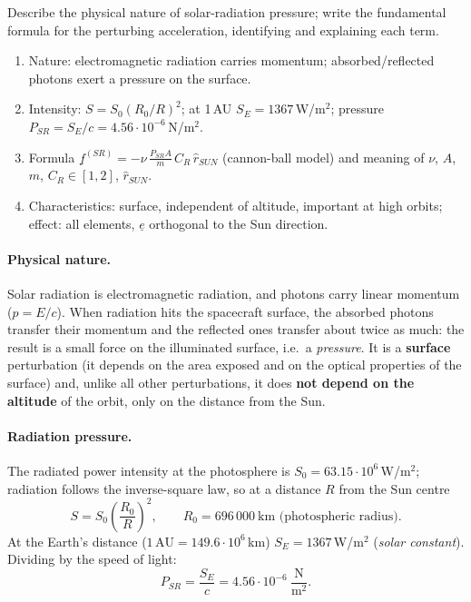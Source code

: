 \begin{qbox}
Describe the physical nature of solar-radiation pressure; write the fundamental formula for the perturbing acceleration,
identifying and explaining each term.
\end{qbox}

\begin{outline}
\begin{enumerate}
\item Nature: electromagnetic radiation carries momentum; absorbed/reflected photons exert a pressure on the surface.
\item Intensity: $S=S_0(R_0/R)^2$; at 1\,AU $S_E=1367$\,W/m$^2$; pressure $P_{SR}=S_E/c=4.56\cdot10^{-6}$\,N/m$^2$.
\item Formula $\underline f^{(SR)}=-\nu\,\frac{P_{SR}A}{m}\,C_R\,\hat r_{SUN}$ (cannon-ball model) and meaning of $\nu$, $A$, $m$, $C_R\in[1,2]$, $\hat r_{SUN}$.
\item Characteristics: surface, independent of altitude, important at high orbits; effect: all elements, $\underline e$ orthogonal to the Sun direction.
\end{enumerate}
\end{outline}

\answer
\paragraph{Physical nature.} Solar radiation is electromagnetic radiation, and photons carry linear momentum ($p=E/c$). When
radiation hits the spacecraft surface, the absorbed photons transfer their momentum and the reflected ones transfer about
twice as much: the result is a small force on the illuminated surface, i.e.\ a \emph{pressure}. It is a \textbf{surface} perturbation
(it depends on the area exposed and on the optical properties of the surface) and, unlike all other perturbations, it does
\textbf{not depend on the altitude} of the orbit, only on the distance from the Sun.

\paragraph{Radiation pressure.} The radiated power intensity at the photosphere is $S_0=63.15\cdot10^6$\,W/m$^2$; radiation follows the
inverse-square law, so at a distance $R$ from the Sun centre
\begin{equation}
S=S_{0}\left(\frac{R_{0}}{R}\right)^{2},\qquad R_0=696\,000\ \text{km (photospheric radius)}.
\end{equation}
At the Earth's distance ($1\,\text{AU}=149.6\cdot10^6$\,km) $S_E=1367$\,W/m$^2$ (\emph{solar constant}). Dividing by the speed of light:
\begin{equation}
P_{SR}=\frac{S_{E}}{c}=4.56\cdot10^{-6}\ \frac{\text{N}}{\text{m}^{2}}.
\end{equation}

